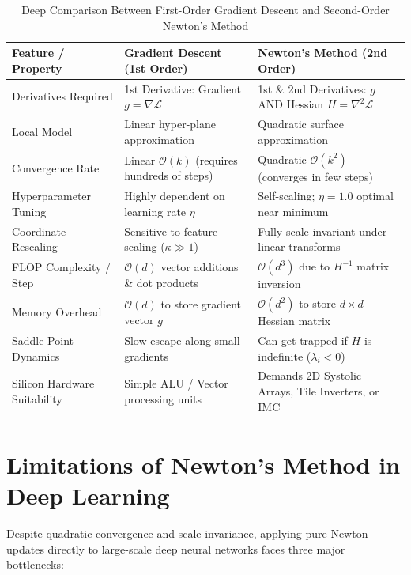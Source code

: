 \begin{table}[htbp]
\centering
\caption{Deep Comparison Between First-Order Gradient Descent and Second-Order Newton's Method}
\label{tab:ch02_gd_vs_newton}
\begin{tabularx}{\textwidth}{>{\raggedright\arraybackslash}p{4.2cm} >{\raggedright\arraybackslash}X >{\raggedright\arraybackslash}X}
\toprule
\textbf{Feature / Property} & \textbf{Gradient Descent (1st Order)} & \textbf{Newton's Method (2nd Order)} \\
\midrule
Derivatives Required & 1st Derivative: Gradient $g = \nabla \mathcal{L}$ & 1st \& 2nd Derivatives: $g$ AND Hessian $H = \nabla^2 \mathcal{L}$ \\
Local Model & Linear hyper-plane approximation & Quadratic surface approximation \\
Convergence Rate & Linear $\mathcal{O}(k)$ (requires hundreds of steps) & Quadratic $\mathcal{O}(k^2)$ (converges in few steps) \\
Hyperparameter Tuning & Highly dependent on learning rate $\eta$ & Self-scaling; $\eta = 1.0$ optimal near minimum \\
Coordinate Rescaling & Sensitive to feature scaling ($\kappa \gg 1$) & Fully scale-invariant under linear transforms \\
FLOP Complexity / Step & $\mathcal{O}(d)$ vector additions \& dot products & $\mathcal{O}(d^3)$ due to $H^{-1}$ matrix inversion \\
Memory Overhead & $\mathcal{O}(d)$ to store gradient vector $g$ & $\mathcal{O}(d^2)$ to store $d \times d$ Hessian matrix \\
Saddle Point Dynamics & Slow escape along small gradients & Can get trapped if $H$ is indefinite ($\lambda_i < 0$) \\
Silicon Hardware Suitability & Simple ALU / Vector processing units & Demands 2D Systolic Arrays, Tile Inverters, or IMC \\
\bottomrule
\end{tabularx}
\end{table}


\section{Limitations of Newton's Method in Deep Learning}
Despite quadratic convergence and scale invariance, applying pure Newton updates directly to large-scale deep neural networks faces three major bottlenecks:


